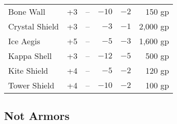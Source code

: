 \begin{center}
\begin{footnotesize}
\begin{tabular}{|lrrrrr|}
\parbox[c][12pt]{1pt}{}Bone Wall&+3&--&$-10$&$-2$&150 gp\\
Crystal Shield&+3&--&$-3$&$-1$&2,000 gp\\
Ice Aegis&+5&--&$-5$&$-3$&1,600 gp\\
Kappa Shell&+3&--&$-12$&$-5$&500 gp\\
Kite Shield&+4&--&$-5$&$-2$&120 gp\\
Tower Shield&+4&--&$-10$&$-2$&100 gp\\\hline
\end{tabular}
\end{footnotesize}
\end{center}

\newpage

\columnsections
\subsection{Not Armors}
